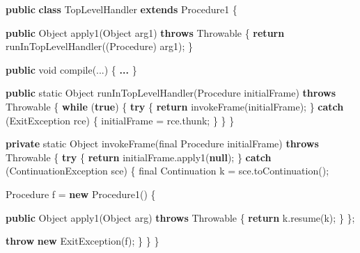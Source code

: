 \documentclass[12pt,a4paper,oneside,openright]{book}
\newenvironment{Shaded}{\begin{snugshade}}{\end{snugshade}}
\newcommand{\KeywordTok}[1]{\textcolor[rgb]{0.13,0.29,0.53}{\textbf{{#1}}}}
\newcommand{\DataTypeTok}[1]{\textcolor[rgb]{0.13,0.29,0.53}{{#1}}}
\newcommand{\FunctionTok}[1]{\textcolor[rgb]{0.00,0.00,0.00}{{#1}}}
\newcommand{\NormalTok}[1]{{#1}}
\begin{document}
\begin{Shaded}
\begin{Highlighting}[]
\KeywordTok{public} \KeywordTok{class} \NormalTok{TopLevelHandler }\KeywordTok{extends} \NormalTok{Procedure1 \{}

    \KeywordTok{public} \NormalTok{Object }\FunctionTok{apply1}\NormalTok{(Object arg1) }\KeywordTok{throws} \NormalTok{Throwable \{}
        \KeywordTok{return} \FunctionTok{runInTopLevelHandler}\NormalTok{((Procedure) arg1);}
    \NormalTok{\}}

    \KeywordTok{public} \DataTypeTok{void} \FunctionTok{compile}\NormalTok{(...) \{ }\KeywordTok{... }\NormalTok{\}}

    \KeywordTok{public} \DataTypeTok{static} \NormalTok{Object }\FunctionTok{runInTopLevelHandler}\NormalTok{(Procedure initialFrame)}
    \KeywordTok{throws} \NormalTok{Throwable \{}
        \KeywordTok{while} \NormalTok{(}\KeywordTok{true}\NormalTok{) \{}
            \KeywordTok{try} \NormalTok{\{}
                \KeywordTok{return} \FunctionTok{invokeFrame}\NormalTok{(initialFrame);}
            \NormalTok{\} }\KeywordTok{catch} \NormalTok{(ExitException rce) \{}
                \NormalTok{initialFrame = rce.}\FunctionTok{thunk}\NormalTok{;}
            \NormalTok{\}}
        \NormalTok{\}}
    \NormalTok{\}}

    \KeywordTok{private} \DataTypeTok{static} \NormalTok{Object }\FunctionTok{invokeFrame}\NormalTok{(}\DataTypeTok{final} \NormalTok{Procedure initialFrame)}
    \KeywordTok{throws} \NormalTok{Throwable \{}
        \KeywordTok{try} \NormalTok{\{}
            \KeywordTok{return} \NormalTok{initialFrame.}\FunctionTok{apply1}\NormalTok{(}\KeywordTok{null}\NormalTok{);}
        \NormalTok{\} }\KeywordTok{catch} \NormalTok{(ContinuationException sce) \{}
            \DataTypeTok{final} \NormalTok{Continuation k = sce.}\FunctionTok{toContinuation}\NormalTok{();}

            \NormalTok{Procedure f = }\KeywordTok{new} \FunctionTok{Procedure1}\NormalTok{() \{}

                \KeywordTok{public} \NormalTok{Object }\FunctionTok{apply1}\NormalTok{(Object arg) }\KeywordTok{throws} \NormalTok{Throwable \{}
                    \KeywordTok{return} \NormalTok{k.}\FunctionTok{resume}\NormalTok{(k);}
                \NormalTok{\}}
            \NormalTok{\};}

            \KeywordTok{throw} \KeywordTok{new} \FunctionTok{ExitException}\NormalTok{(f);}
        \NormalTok{\}}
    \NormalTok{\}}
\NormalTok{\}}
\end{Highlighting}
\end{Shaded}
\end{document}
